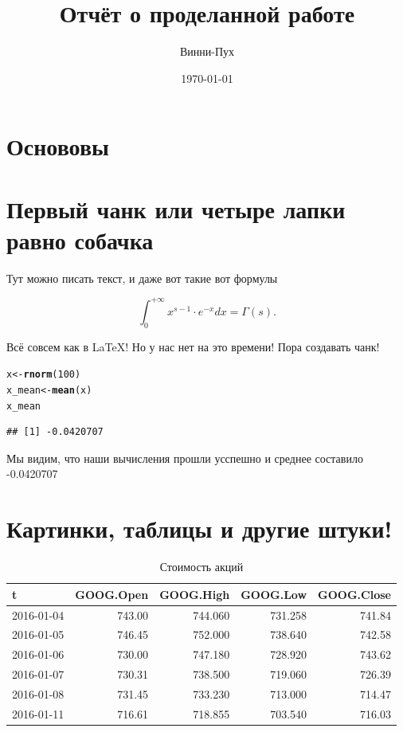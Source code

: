 \documentclass[12pt, a4paper]{article}\usepackage[]{graphicx}\usepackage[]{color}
\title{Отчёт о проделанной работе}
\author{Винни-Пух}
\date{\today}
\makeatletter
\newcommand{\hlnum}[1]{\textcolor[rgb]{0.686,0.059,0.569}{#1}}%
\newcommand{\hlstd}[1]{\textcolor[rgb]{0.345,0.345,0.345}{#1}}%
\newcommand{\hlkwb}[1]{\textcolor[rgb]{0.69,0.353,0.396}{#1}}%
\newcommand{\hlkwd}[1]{\textcolor[rgb]{0.737,0.353,0.396}{\textbf{#1}}}%
\newenvironment{kframe}{%
 \def\at@end@of@kframe{}%
 \ifinner\ifhmode%
  \def\at@end@of@kframe{\end{minipage}}%
  \begin{minipage}{\columnwidth}%
 \fi\fi%
 \def\FrameCommand##1{\hskip\@totalleftmargin \hskip-\fboxsep
 \colorbox{shadecolor}{##1}\hskip-\fboxsep
     \hskip-\linewidth \hskip-\@totalleftmargin \hskip\columnwidth}%
 \MakeFramed {\advance\hsize-\width
   \@totalleftmargin\z@ \linewidth\hsize
   \@setminipage}}%
 {\par\unskip\endMakeFramed%
 \at@end@of@kframe}
\newenvironment{knitrout}{}{} %
\makeatother
\begin{document}
\maketitle

\section{Основовы}




\section{Первый чанк или четыре лапки равно собачка}

Тут можно писать текст, и даже вот такие вот формулы

\[ \int_{0}^{+\infty} x^{s-1} \cdot e^{-x} dx = \Gamma(s). \]

Всё совсем как в \LaTeX! Но у нас нет на это времени! Пора создавать чанк!


\begin{knitrout}
\color{fgcolor}\begin{kframe}
\begin{alltt}
\hlstd{x} \hlkwb{<-} \hlkwd{rnorm}\hlstd{(}\hlnum{100}\hlstd{)}
\hlstd{x_mean} \hlkwb{<-} \hlkwd{mean}\hlstd{(x)}
\hlstd{x_mean}
\end{alltt}
\begin{verbatim}
## [1] -0.0420707
\end{verbatim}
\end{kframe}
\end{knitrout}

Мы видим, что наши вычисления прошли усспешно и среднее составило -0.0420707



\section{Картинки, таблицы и другие штуки!}




\begin{table}[h!]
\begin{center}

\begin{tabular}{l|r|r|r|r}
\hline
t & GOOG.Open & GOOG.High & GOOG.Low & GOOG.Close\\
\hline
2016-01-04 & 743.00 & 744.060 & 731.258 & 741.84\\
\hline
2016-01-05 & 746.45 & 752.000 & 738.640 & 742.58\\
\hline
2016-01-06 & 730.00 & 747.180 & 728.920 & 743.62\\
\hline
2016-01-07 & 730.31 & 738.500 & 719.060 & 726.39\\
\hline
2016-01-08 & 731.45 & 733.230 & 713.000 & 714.47\\
\hline
2016-01-11 & 716.61 & 718.855 & 703.540 & 716.03\\
\hline
\end{tabular}


\caption{Стоимость акций}
\end{center} 
\end{table}
\end{document}
